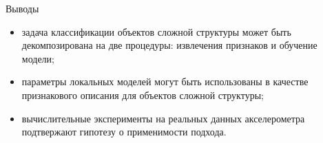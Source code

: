 \documentclass{beamer}
\begin{document}
\begin{frame}{Выводы}
		\begin{itemize}
			\item задача классификации объектов сложной структуры может быть декомпозирована на две процедуры: извлечения признаков и обучение модели;
			\vfill
			\item параметры локальных моделей могут быть использованы в качестве признакового описания для объектов сложной структуры;
			\vfill
			\item вычислительные эксперименты на реальных данных акселерометра подтвержают гипотезу о применимости подхода.
		\end{itemize}
\end{frame}
\end{document}
